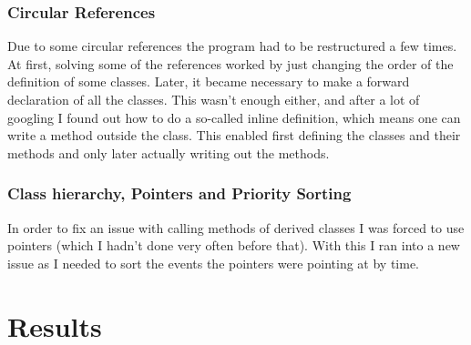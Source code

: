 \documentclass[10pt]{report}
\begin{document}
\subsection{Circular References}
Due to some circular references the program had to be restructured a few times. At first, solving some of the references worked by just changing the order of the definition of some classes. Later, it became necessary to make a forward declaration of all the classes. This wasn't enough either, and after a lot of googling I found out how to do a so-called inline definition, which means one can write a method outside the class. This enabled first defining the classes and their methods and only later actually writing out the methods.

\subsection{Class hierarchy, Pointers and Priority Sorting}
In order to fix an issue with calling methods of derived classes I was forced to use pointers (which I hadn't done very often before that). With this I ran into a new issue as I needed to sort the events the pointers were pointing at by time.

\chapter{Results}
\end{document}
